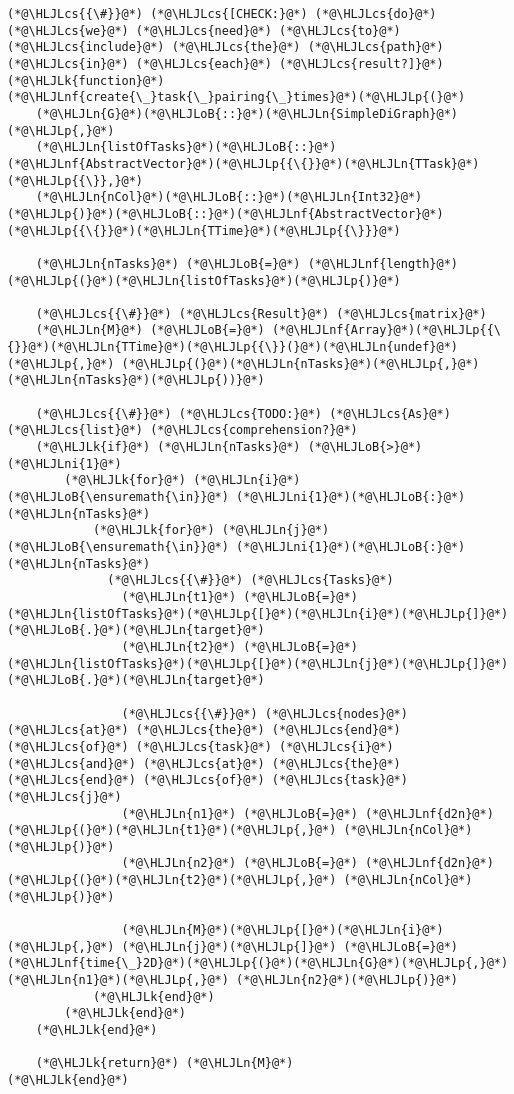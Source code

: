 \documentclass[12pt,a4paper]{article}
\newcommand{\HLJLk}[1]{\textcolor[RGB]{148,91,176}{\textbf{#1}}}
\newcommand{\HLJLn}[1]{#1}
\newcommand{\HLJLnf}[1]{\textcolor[RGB]{66,102,213}{#1}}
\newcommand{\HLJLni}[1]{\textcolor[RGB]{59,151,46}{#1}}
\newcommand{\HLJLoB}[1]{\textcolor[RGB]{102,102,102}{\textbf{#1}}}
\newcommand{\HLJLp}[1]{#1}
\newcommand{\HLJLcs}[1]{\textcolor[RGB]{153,153,119}{\textit{#1}}}
\begin{document}
\begin{lstlisting}
(*@\HLJLcs{{\#}}@*) (*@\HLJLcs{[CHECK:}@*) (*@\HLJLcs{do}@*) (*@\HLJLcs{we}@*) (*@\HLJLcs{need}@*) (*@\HLJLcs{to}@*) (*@\HLJLcs{include}@*) (*@\HLJLcs{the}@*) (*@\HLJLcs{path}@*) (*@\HLJLcs{in}@*) (*@\HLJLcs{each}@*) (*@\HLJLcs{result?]}@*)
(*@\HLJLk{function}@*) (*@\HLJLnf{create{\_}task{\_}pairing{\_}times}@*)(*@\HLJLp{(}@*)
    (*@\HLJLn{G}@*)(*@\HLJLoB{::}@*)(*@\HLJLn{SimpleDiGraph}@*)(*@\HLJLp{,}@*)
    (*@\HLJLn{listOfTasks}@*)(*@\HLJLoB{::}@*)(*@\HLJLnf{AbstractVector}@*)(*@\HLJLp{{\{}}@*)(*@\HLJLn{TTask}@*)(*@\HLJLp{{\}},}@*)
    (*@\HLJLn{nCol}@*)(*@\HLJLoB{::}@*)(*@\HLJLn{Int32}@*)(*@\HLJLp{)}@*)(*@\HLJLoB{::}@*)(*@\HLJLnf{AbstractVector}@*)(*@\HLJLp{{\{}}@*)(*@\HLJLn{TTime}@*)(*@\HLJLp{{\}}}@*)

    (*@\HLJLn{nTasks}@*) (*@\HLJLoB{=}@*) (*@\HLJLnf{length}@*)(*@\HLJLp{(}@*)(*@\HLJLn{listOfTasks}@*)(*@\HLJLp{)}@*)

    (*@\HLJLcs{{\#}}@*) (*@\HLJLcs{Result}@*) (*@\HLJLcs{matrix}@*)
    (*@\HLJLn{M}@*) (*@\HLJLoB{=}@*) (*@\HLJLnf{Array}@*)(*@\HLJLp{{\{}}@*)(*@\HLJLn{TTime}@*)(*@\HLJLp{{\}}(}@*)(*@\HLJLn{undef}@*)(*@\HLJLp{,}@*) (*@\HLJLp{(}@*)(*@\HLJLn{nTasks}@*)(*@\HLJLp{,}@*) (*@\HLJLn{nTasks}@*)(*@\HLJLp{))}@*)

    (*@\HLJLcs{{\#}}@*) (*@\HLJLcs{TODO:}@*) (*@\HLJLcs{As}@*) (*@\HLJLcs{list}@*) (*@\HLJLcs{comprehension?}@*)
    (*@\HLJLk{if}@*) (*@\HLJLn{nTasks}@*) (*@\HLJLoB{>}@*) (*@\HLJLni{1}@*)
        (*@\HLJLk{for}@*) (*@\HLJLn{i}@*) (*@\HLJLoB{\ensuremath{\in}}@*) (*@\HLJLni{1}@*)(*@\HLJLoB{:}@*)(*@\HLJLn{nTasks}@*)
            (*@\HLJLk{for}@*) (*@\HLJLn{j}@*) (*@\HLJLoB{\ensuremath{\in}}@*) (*@\HLJLni{1}@*)(*@\HLJLoB{:}@*)(*@\HLJLn{nTasks}@*)
              (*@\HLJLcs{{\#}}@*) (*@\HLJLcs{Tasks}@*)
                (*@\HLJLn{t1}@*) (*@\HLJLoB{=}@*) (*@\HLJLn{listOfTasks}@*)(*@\HLJLp{[}@*)(*@\HLJLn{i}@*)(*@\HLJLp{]}@*)(*@\HLJLoB{.}@*)(*@\HLJLn{target}@*)
                (*@\HLJLn{t2}@*) (*@\HLJLoB{=}@*) (*@\HLJLn{listOfTasks}@*)(*@\HLJLp{[}@*)(*@\HLJLn{j}@*)(*@\HLJLp{]}@*)(*@\HLJLoB{.}@*)(*@\HLJLn{target}@*)

                (*@\HLJLcs{{\#}}@*) (*@\HLJLcs{nodes}@*) (*@\HLJLcs{at}@*) (*@\HLJLcs{the}@*) (*@\HLJLcs{end}@*) (*@\HLJLcs{of}@*) (*@\HLJLcs{task}@*) (*@\HLJLcs{i}@*) (*@\HLJLcs{and}@*) (*@\HLJLcs{at}@*) (*@\HLJLcs{the}@*) (*@\HLJLcs{end}@*) (*@\HLJLcs{of}@*) (*@\HLJLcs{task}@*) (*@\HLJLcs{j}@*)
                (*@\HLJLn{n1}@*) (*@\HLJLoB{=}@*) (*@\HLJLnf{d2n}@*)(*@\HLJLp{(}@*)(*@\HLJLn{t1}@*)(*@\HLJLp{,}@*) (*@\HLJLn{nCol}@*)(*@\HLJLp{)}@*)
                (*@\HLJLn{n2}@*) (*@\HLJLoB{=}@*) (*@\HLJLnf{d2n}@*)(*@\HLJLp{(}@*)(*@\HLJLn{t2}@*)(*@\HLJLp{,}@*) (*@\HLJLn{nCol}@*)(*@\HLJLp{)}@*)

                (*@\HLJLn{M}@*)(*@\HLJLp{[}@*)(*@\HLJLn{i}@*)(*@\HLJLp{,}@*) (*@\HLJLn{j}@*)(*@\HLJLp{]}@*) (*@\HLJLoB{=}@*) (*@\HLJLnf{time{\_}2D}@*)(*@\HLJLp{(}@*)(*@\HLJLn{G}@*)(*@\HLJLp{,}@*) (*@\HLJLn{n1}@*)(*@\HLJLp{,}@*) (*@\HLJLn{n2}@*)(*@\HLJLp{)}@*)
            (*@\HLJLk{end}@*)
        (*@\HLJLk{end}@*)
    (*@\HLJLk{end}@*)

    (*@\HLJLk{return}@*) (*@\HLJLn{M}@*)
(*@\HLJLk{end}@*)
\end{lstlisting}
\end{document}
